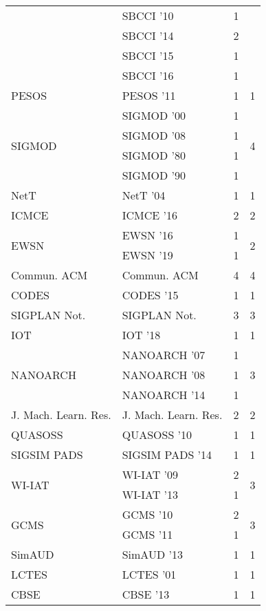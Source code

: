 \begin{table*}[t]
\begin{tabular}{llrr}
& SBCCI '10 & 1 &\\
& SBCCI '14 & 2 &\\
& SBCCI '15 & 1 &\\
& SBCCI '16 & 1 &\\
\multirow{1}{*}{PESOS } & PESOS '11 & 1 & \multirow{1}{*}{1}\\
\multirow{4}{*}{SIGMOD } & SIGMOD '00 & 1 & \multirow{4}{*}{4}\\
& SIGMOD '08 & 1 &\\
& SIGMOD '80 & 1 &\\
& SIGMOD '90 & 1 &\\
\multirow{1}{*}{NetT } & NetT '04 & 1 & \multirow{1}{*}{1}\\
\multirow{1}{*}{ICMCE } & ICMCE '16 & 2 & \multirow{1}{*}{2}\\
\multirow{2}{*}{EWSN } & EWSN '16 & 1 & \multirow{2}{*}{2}\\
& EWSN '19 & 1 &\\
\multirow{1}{*}{Commun. ACM} & Commun. ACM & 4 & \multirow{1}{*}{4}\\
\multirow{1}{*}{CODES } & CODES '15 & 1 & \multirow{1}{*}{1}\\
\multirow{1}{*}{SIGPLAN Not.} & SIGPLAN Not. & 3 & \multirow{1}{*}{3}\\
\multirow{1}{*}{IOT } & IOT '18 & 1 & \multirow{1}{*}{1}\\
\multirow{3}{*}{NANOARCH } & NANOARCH '07 & 1 & \multirow{3}{*}{3}\\
& NANOARCH '08 & 1 &\\
& NANOARCH '14 & 1 &\\
\multirow{1}{*}{J. Mach. Learn. Res.} & J. Mach. Learn. Res. & 2 & \multirow{1}{*}{2}\\
\multirow{1}{*}{QUASOSS } & QUASOSS '10 & 1 & \multirow{1}{*}{1}\\
\multirow{1}{*}{SIGSIM PADS } & SIGSIM PADS '14 & 1 & \multirow{1}{*}{1}\\
\multirow{2}{*}{WI-IAT } & WI-IAT '09 & 2 & \multirow{2}{*}{3}\\
& WI-IAT '13 & 1 &\\
\multirow{2}{*}{GCMS } & GCMS '10 & 2 & \multirow{2}{*}{3}\\
& GCMS '11 & 1 &\\
\multirow{1}{*}{SimAUD } & SimAUD '13 & 1 & \multirow{1}{*}{1}\\
\multirow{1}{*}{LCTES } & LCTES '01 & 1 & \multirow{1}{*}{1}\\
\multirow{1}{*}{CBSE } & CBSE '13 & 1 & \multirow{1}{*}{1}\\

\end{tabular}
\end{table*}

